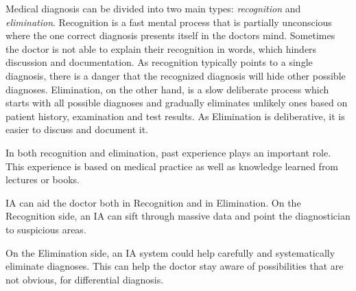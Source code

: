 \documentclass[11pt]{pnas-new}
\begin{document}
Medical diagnosis can be divided into two main types: {\em
  recognition} and {\em elimination}. Recognition is a fast mental
process that is partially unconscious where the one correct diagnosis presents itself in the doctors mind.  Sometimes the doctor is not able to explain their recognition in words, which hinders discussion and documentation.  As recognition 
typically points to a single diagnosis, there is a danger that the
recognized diagnosis will hide other possible diagnoses.
Elimination, on the other hand, is a slow deliberate process  which starts with all possible diagnoses and gradually eliminates
unlikely ones based on patient history, examination and test
results. As Elimination is deliberative, it is easier to discuss and
document it.

In both recognition and elimination, past experience plays an important role. This experience is based on medical practice as well as knowledge learned from lectures or books. 

IA can aid the doctor both in Recognition and in Elimination. On the Recognition side, an IA can sift through massive data and point the diagnostician to suspicious areas.

On the Elimination side, an IA system could help carefully and systematically
eliminate diagnoses. This can help the doctor stay aware of possibilities that are not obvious, for differential diagnosis.

\end{document}
